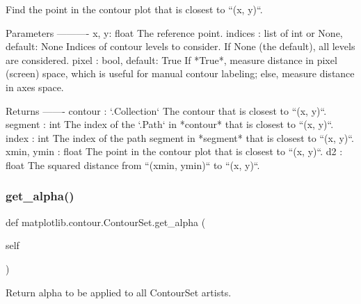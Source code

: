 \begin{DoxyVerb}Find the point in the contour plot that is closest to ``(x, y)``.

Parameters
----------
x, y: float
    The reference point.
indices : list of int or None, default: None
    Indices of contour levels to consider.  If None (the default), all
    levels are considered.
pixel : bool, default: True
    If *True*, measure distance in pixel (screen) space, which is
    useful for manual contour labeling; else, measure distance in axes
    space.

Returns
-------
contour : `.Collection`
    The contour that is closest to ``(x, y)``.
segment : int
    The index of the `.Path` in *contour* that is closest to
    ``(x, y)``.
index : int
    The index of the path segment in *segment* that is closest to
    ``(x, y)``.
xmin, ymin : float
    The point in the contour plot that is closest to ``(x, y)``.
d2 : float
    The squared distance from ``(xmin, ymin)`` to ``(x, y)``.
\end{DoxyVerb}
 \mbox{\label{classmatplotlib_1_1contour_1_1ContourSet_afd47cb2a1df93bfb8f09ebd5a8df70fc}} 
\subsubsection{\texorpdfstring{get\+\_\+alpha()}{get\_alpha()}}
{\footnotesize\ttfamily def matplotlib.\+contour.\+Contour\+Set.\+get\+\_\+alpha (\begin{DoxyParamCaption}\item[{}]{self }\end{DoxyParamCaption})}

\begin{DoxyVerb}Return alpha to be applied to all ContourSet artists.\end{DoxyVerb}
 \mbox{\label{classmatplotlib_1_1contour_1_1ContourSet_ab0f04e3c84410a49c1eee1c3e38d1f5b}} 
